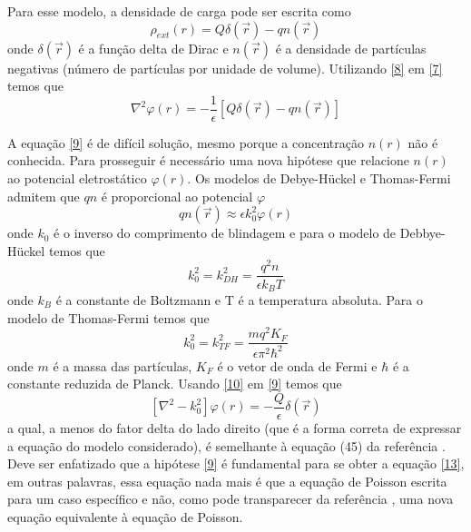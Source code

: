 \documentclass[brazilian,10.7pt,a4paper]{article}
\begin{document}
\begin{multicols}{2}
\par Para esse modelo, a densidade de carga pode ser escrita como
\\
\begin{equation}\label{8}
\rho_{ext}(r)=Q\delta(\vec{r})-qn(\vec{r})
\end{equation}
onde $\delta(\vec{r})$ é a função delta de Dirac e $n(\vec{r})$ é a densidade de partículas negativas (número de partículas por unidade de volume). Utilizando \eqref{8} em \eqref{7} temos que
\\
\begin{equation}\label{9}
\nabla^{2}\varphi(r)=-\frac{1}{\epsilon}[Q\delta(\vec{r})-qn(\vec{r})]
\end{equation}
\par A equação \eqref{9} é de difícil solução, mesmo porque a concentração $n(r)$ não é conhecida. Para prosseguir é necessário uma nova hipótese que relacione $n(r)$ ao potencial eletrostático $\varphi(r)$. Os modelos de Debye-Hückel e Thomas-Fermi admitem que $qn$ é proporcional ao potencial $\varphi$
\\
\begin{equation}\label{10}
qn(\vec{r})\approx \epsilon k^{2}_{0}\varphi(r)
\end{equation}
onde $k_{0}$ é o inverso do comprimento de blindagem e para o modelo de Debbye-Hückel temos que
\\
\begin{equation}\label{11}
k^{2}_{0}=k^{2}_{DH}=\frac{q^{2}n}{\epsilon k_{B}T}
\end{equation}
onde $k_{B}$ é a constante de Boltzmann e T é a temperatura absoluta. Para o modelo de Thomas-Fermi temos que
\\
\begin{equation}\label{12}
k^{2}_{0}=k^{2}_{TF}=\frac{mq^{2}K_{F}}{\epsilon\pi^{2}\hbar^{2}}
\end{equation}
onde $m$ é a massa das partículas, $K_{F}$ é o vetor de onda de Fermi e $\hbar$ é a constante reduzida de Planck. Usando \eqref{10} em \eqref{9} temos que
\\
\begin{equation}\label{13}
[\nabla^{2}-k^{2}_{0}]\varphi(r)=-\frac{Q}{\epsilon}\delta(\vec{r})
\end{equation}
a qual, a menos do fator delta do lado direito (que é a forma correta de expressar a equação do modelo considerado), é semelhante à equação (45) da referência \cite{ramos}. Deve ser enfatizado que a hipótese \eqref{9} é fundamental para se obter a equação \eqref{13}, em outras palavras, essa equação nada mais é que a equação de Poisson escrita para um caso específico e não, como pode transparecer da referência \cite{ramos}, uma nova equação equivalente à equação de Poisson.

\end{multicols}
\end{document}
